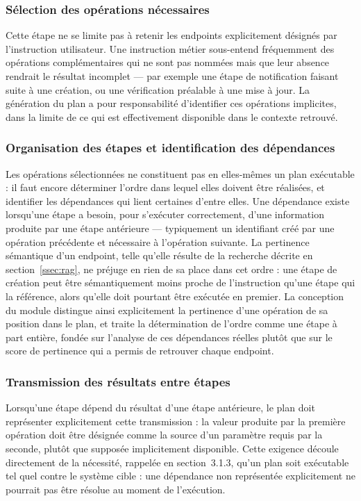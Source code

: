 \subsubsection{Sélection des opérations nécessaires}

Cette étape ne se limite pas à retenir les endpoints explicitement désignés par l'instruction utilisateur. Une instruction métier sous-entend fréquemment des opérations complémentaires qui ne sont pas nommées mais que leur absence rendrait le résultat incomplet — par exemple une étape de notification faisant suite à une création, ou une vérification préalable à une mise à jour. La génération du plan a pour responsabilité d'identifier ces opérations implicites, dans la limite de ce qui est effectivement disponible dans le contexte retrouvé.

\subsubsection{Organisation des étapes et identification des dépendances}

Les opérations sélectionnées ne constituent pas en elles-mêmes un plan exécutable : il faut encore déterminer l'ordre dans lequel elles doivent être réalisées, et identifier les dépendances qui lient certaines d'entre elles. Une dépendance existe lorsqu'une étape a besoin, pour s'exécuter correctement, d'une information produite par une étape antérieure — typiquement un identifiant créé par une opération précédente et nécessaire à l'opération suivante. La pertinence sémantique d'un endpoint, telle qu'elle résulte de la recherche décrite en section~\ref{ssec:rag}, ne préjuge en rien de sa place dans cet ordre : une étape de création peut être sémantiquement moins proche de l'instruction qu'une étape qui la référence, alors qu'elle doit pourtant être exécutée en premier. La conception du module distingue ainsi explicitement la pertinence d'une opération de sa position dans le plan, et traite la détermination de l'ordre comme une étape à part entière, fondée sur l'analyse de ces dépendances réelles plutôt que sur le score de pertinence qui a permis de retrouver chaque endpoint.

\subsubsection{Transmission des résultats entre étapes}

Lorsqu'une étape dépend du résultat d'une étape antérieure, le plan doit représenter explicitement cette transmission : la valeur produite par la première opération doit être désignée comme la source d'un paramètre requis par la seconde, plutôt que supposée implicitement disponible. Cette exigence découle directement de la nécessité, rappelée en section~3.1.3, qu'un plan soit exécutable tel quel contre le système cible : une dépendance non représentée explicitement ne pourrait pas être résolue au moment de l'exécution.

